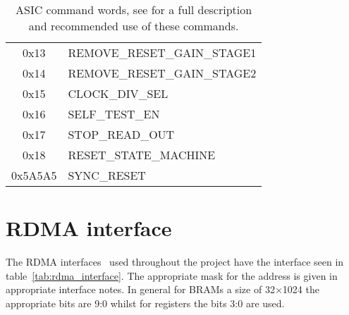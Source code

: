 \documentclass[]{article}
\begin{document}
\begin{table}
\begin{center}
\begin{tabular}{c | l}
                0x13 & REMOVE\_RESET\_GAIN\_STAGE1 \\
                0x14 & REMOVE\_RESET\_GAIN\_STAGE2 \\
                0x15 & CLOCK\_DIV\_SEL \\
                0x16 & SELF\_TEST\_EN \\
                0x17 & STOP\_READ\_OUT \\
                0x18 & RESET\_STATE\_MACHINE \\
                0x5A5A5 & SYNC\_RESET \\
            \end{tabular}
        \end{center}
        \caption{ASIC command words, see \cite{REF FOR LPD ASIC} for a full description and recommended use of these commands.}
        \label{tab:asic_command_words}
    \end{table}
    \section{RDMA interface} %
    \label{sec:rdma_interface}
    The RDMA interfaces~\cite{RDMA INTERFACE} used throughout the project have the interface seen in table~\ref{tab:rdma_interface}. The appropriate mask for the address is given in appropriate interface notes. In general for BRAMs a size of 32\(\times\)1024 the appropriate bits are 9:0 whilst for registers the bits 3:0 are used. 
    
\end{document}
